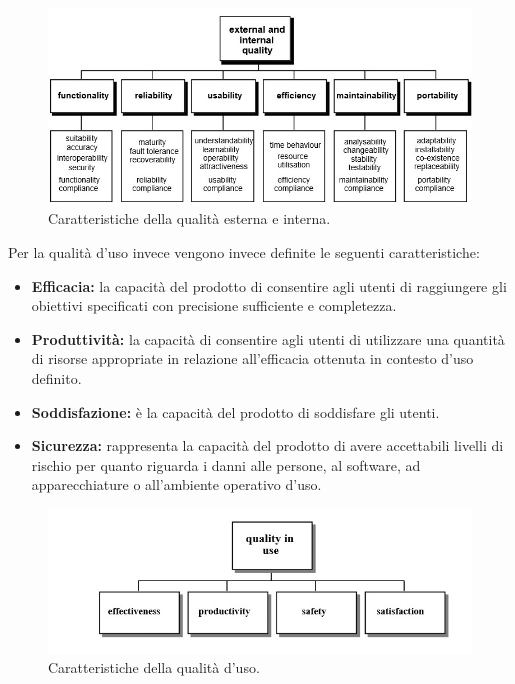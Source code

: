 \documentclass[a4paper]{article}
\begin{document}
				\begin{figure}[H]
				\centering
					\includegraphics[scale=0.65]{immagini/Pdq/metrichediqualita.png}
					\caption{Caratteristiche della qualità esterna e interna.}
				\end{figure}
				Per la qualità d'uso invece vengono invece definite le seguenti caratteristiche:
				\begin{itemize}
					\item \textbf{Efficacia:} la capacità del prodotto di consentire agli utenti di raggiungere gli obiettivi
					specificati con precisione sufficiente e completezza. 
					\item \textbf{Produttività:} la capacità di consentire agli utenti di utilizzare una quantità di risorse
					appropriate in relazione all'efficacia ottenuta in contesto d'uso definito. 
					\item \textbf{Soddisfazione:} è la capacità del prodotto di soddisfare gli utenti. 
					\item \textbf{Sicurezza:} rappresenta la capacità del prodotto di avere accettabili livelli di rischio per
					quanto riguarda i danni alle persone, al software, ad apparecchiature o all'ambiente operativo d'uso. 
				\end{itemize}
				
				\begin{figure}[H]
					\centering
					\includegraphics[scale=0.65]{immagini/Pdq/qualitainuso.png}
					\caption{Caratteristiche della qualità d'uso.}
				\end{figure}
\end{document}
